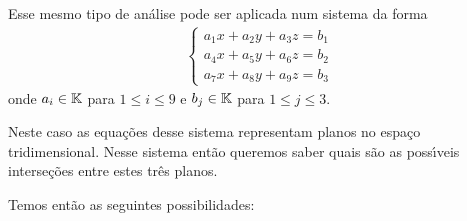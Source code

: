 Esse mesmo tipo de an\'alise pode ser aplicada num sistema da forma
\begin{align}
    \begin{cases}\label{sistema_linear_3x3}
        a_1x + a_2y + a_3z = b_1\\
        a_4x + a_5y + a_6z = b_2\\
        a_7x + a_8y + a_9z = b_3
    \end{cases}
\end{align}
onde $a_i \in \mathbb{K}$ para $1 \le i \le 9$ e $b_j \in \mathbb{K}$ para $1 \le j \le 3$.

Neste caso as equa\c{c}\~oes desse sistema representam planos no espa\c{c}o tridimensional. Nesse sistema ent\~ao queremos saber quais s\~ao as poss{\'\i}veis interse\c{c}\~oes entre estes tr\^es planos.

Temos ent\~ao as seguintes possibilidades:

